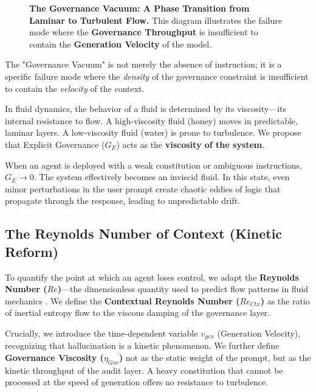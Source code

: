 \documentclass[11pt, a4paper]{article}
\newcommand{\Ge}{G_E}
\newcommand{\ReCtx}{Re_{Ctx}}
\begin{document}
\begin{figure}[t!]
    \centering
    \resizebox{0.95\textwidth}{!}{}
    \caption[\textbf{The Governance Vacuum.}]{\textbf{The Governance Vacuum: A Phase Transition from Laminar to Turbulent Flow.} This diagram illustrates the failure mode where the \textbf{Governance Throughput} is insufficient to contain the \textbf{Generation Velocity} of the model.}
    \label{fig:governance_vacuum}
\end{figure}

The "Governance Vacuum" is not merely the absence of instruction; it is a specific failure mode where the \textit{density} of the governance constraint is insufficient to contain the \textit{velocity} of the context.

In fluid dynamics, the behavior of a fluid is determined by its viscosity---its internal resistance to flow. A high-viscosity fluid (honey) moves in predictable, laminar layers. A low-viscosity fluid (water) is prone to turbulence. We propose that Explicit Governance ($\Ge$) acts as the \textbf{viscosity of the system}.

When an agent is deployed with a weak constitution or ambiguous instructions, $\Ge \to 0$. The system effectively becomes an inviscid fluid. In this state, even minor perturbations in the user prompt create chaotic eddies of logic that propagate through the response, leading to unpredictable drift.

\subsection{The Reynolds Number of Context (Kinetic Reform)}

To quantify the point at which an agent loses control, we adapt the \textbf{Reynolds Number ($Re$)}---the dimensionless quantity used to predict flow patterns in fluid mechanics \cite{reynolds1883}. We define the \textbf{Contextual Reynolds Number ($\ReCtx$)} as the ratio of inertial entropy flow to the viscous damping of the governance layer.

Crucially, we introduce the time-dependent variable $v_{gen}$ (Generation Velocity), recognizing that hallucination is a kinetic phenomenon. We further define \textbf{Governance Viscosity ($\eta_{Gov}$)} not as the static weight of the prompt, but as the kinetic throughput of the audit layer. A heavy constitution that cannot be processed at the speed of generation offers no resistance to turbulence.
\end{document}
